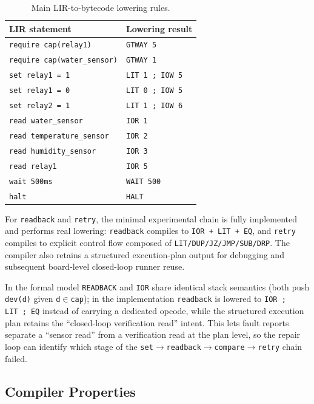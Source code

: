 \documentclass[a4paper,fleqn,longmktitle]{cas-dc}
\begin{document}
\begin{table}[t]
\centering
\caption{Main LIR-to-bytecode lowering rules.}
\label{tab:lowering}
\footnotesize
\begin{tabular}{ll}
\toprule
LIR statement & Lowering result \\
\midrule
\texttt{require cap(relay1)} & \texttt{GTWAY 5} \\
\texttt{require cap(water\_sensor)} & \texttt{GTWAY 1} \\
\texttt{set relay1 = 1} & \texttt{LIT 1 ; IOW 5} \\
\texttt{set relay1 = 0} & \texttt{LIT 0 ; IOW 5} \\
\texttt{set relay2 = 1} & \texttt{LIT 1 ; IOW 6} \\
\texttt{read water\_sensor} & \texttt{IOR 1} \\
\texttt{read temperature\_sensor} & \texttt{IOR 2} \\
\texttt{read humidity\_sensor} & \texttt{IOR 3} \\
\texttt{read relay1} & \texttt{IOR 5} \\
\texttt{wait 500ms} & \texttt{WAIT 500} \\
\texttt{halt} & \texttt{HALT} \\
\bottomrule
\end{tabular}
\end{table}

For \texttt{readback} and \texttt{retry}, the minimal experimental chain is fully implemented and performs real lowering: \texttt{readback} compiles to \texttt{IOR + LIT + EQ}, and \texttt{retry} compiles to explicit control flow composed of \texttt{LIT/DUP/JZ/JMP/SUB/DRP}. The compiler also retains a structured execution-plan output for debugging and subsequent board-level closed-loop runner reuse.

In the formal model \texttt{READBACK} and \texttt{IOR} share identical stack semantics (both push \texttt{dev(d)} given \texttt{d$\in$cap}); in the implementation \texttt{readback} is lowered to \texttt{IOR\,;\,LIT\,;\,EQ} instead of carrying a dedicated opcode, while the structured execution plan retains the ``closed-loop verification read'' intent. This lets fault reports separate a ``sensor read'' from a verification read at the plan level, so the repair loop can identify which stage of the \texttt{set$\to$readback$\to$compare$\to$retry} chain failed.

\subsection{Compiler Properties}
\label{sec:compiler_properties}
\end{document}
